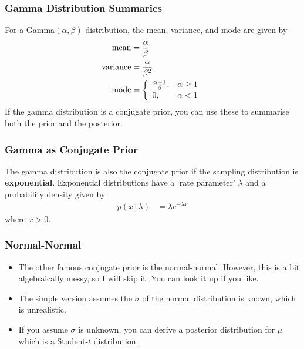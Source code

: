 \documentclass{beamer}
\newcommand{\given}{\,|\,}
\begin{document}
\begin{frame}
\frametitle{Gamma Distribution Summaries}
For a Gamma$(\alpha, \beta)$ distribution, the mean, variance, and mode
are given by
\begin{align}
\textnormal{mean} &= \frac{\alpha}{\beta} \\
\textnormal{variance} &= \frac{\alpha}{\beta^2} \\
\textnormal{mode} &= \left\{
                        \begin{array}{lr}
                        \frac{\alpha-1}{\beta},& \alpha \geq 1 \\
                        0,& \alpha < 1
                        \end{array}
                    \right.
\end{align}
\pause
If the gamma distribution is a conjugate prior, you can use these to summarise
both the prior and the posterior.


\end{frame}


\begin{frame}
\frametitle{Gamma as Conjugate Prior}
The gamma distribution is also the conjugate prior if the sampling
distribution is {\bf exponential}. Exponential distributions have a
`rate parameter' $\lambda$ and a probability density given by
\begin{align}
p(x \given \lambda) &= \lambda e^{-\lambda x}
\end{align}
where $x > 0$.

\end{frame}

\begin{frame}
\frametitle{Normal-Normal}
\begin{itemize}
\item The other famous conjugate prior is the normal-normal. However, this is a bit algebraically
messy, so I will skip it. You can look it up if you like.
\item The simple version assumes the $\sigma$ of the normal distribution is known, which
is unrealistic.\pause
\item If you assume $\sigma$ is unknown, you can derive a posterior distribution for $\mu$
which is a Student-$t$ distribution.
\end{itemize}

\end{frame}
\end{document}
